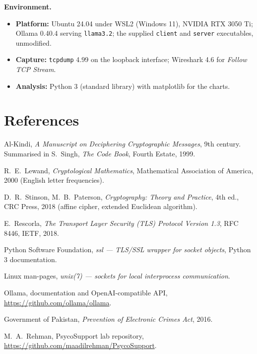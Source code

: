 \documentclass[11pt,a4paper]{article}
\DeclareRobustCommand{\_}{\textunderscore\allowbreak}  %
\newcommand{\ct}[1]{\texttt{#1}}
\begin{document}
\textbf{Environment.}
\begin{itemize}
\item \textbf{Platform:} Ubuntu 24.04 under WSL2 (Windows 11), NVIDIA RTX 3050 Ti; Ollama 0.40.4 serving
      \ct{llama3.2}; the supplied \ct{client} and \ct{server} executables, unmodified.
\item \textbf{Capture:} \ct{tcpdump} 4.99 on the loopback interface; Wireshark 4.6 for \emph{Follow TCP Stream}.
\item \textbf{Analysis:} Python 3 (standard library) with matplotlib for the charts.
\end{itemize}

\section*{References}
\begin{enumerate}[label={[\arabic*]}]
\item Al-Kindi, \emph{A Manuscript on Deciphering Cryptographic Messages}, 9th century. Summarised in S.~Singh,
      \emph{The Code Book}, Fourth Estate, 1999.
\item R.~E.~Lewand, \emph{Cryptological Mathematics}, Mathematical Association of America, 2000 (English letter
      frequencies).
\item D.~R.~Stinson, M.~B.~Paterson, \emph{Cryptography: Theory and Practice}, 4th ed., CRC Press, 2018 (affine cipher,
      extended Euclidean algorithm).
\item E.~Rescorla, \emph{The Transport Layer Security (TLS) Protocol Version 1.3}, RFC 8446, IETF, 2018.
\item Python Software Foundation, \emph{ssl --- TLS/SSL wrapper for socket objects}, Python 3 documentation.
\item Linux man-pages, \emph{unix(7) --- sockets for local interprocess communication}.
\item Ollama, documentation and OpenAI-compatible API, \url{https://github.com/ollama/ollama}.
\item Government of Pakistan, \emph{Prevention of Electronic Crimes Act}, 2016.
\item M.~A.~Rehman, PsycoSupport lab repository, \url{https://github.com/maadilrehman/PsycoSupport}.
\end{enumerate}

\appendix
\newpage
\end{document}
